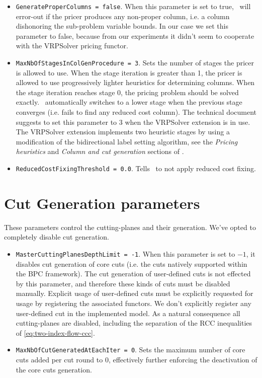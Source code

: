 \begin{itemize}
	\item \texttt{GenerateProperColumns = false}.
	      When this parameter is set to true, \bapcod\ will error-out if the pricer produces any non-proper column,
	      i.e. a column dishonoring the sub-problem variable bounds.
	      In our case we set this parameter to false,
	      because from our experiments it didn't seem to cooperate with the VRPSolver pricing functor.
	\item \texttt{MaxNbOfStagesInColGenProcedure = 3}.
	      Sets the number of stages the pricer is allowed to use.
	      When the stage iteration is greater than 1, the pricer is allowed to use
	      progressively lighter heuristics for determining columns.
	      When the stage iteration reaches stage 0, the pricing problem should be solved exactly.
	      \bapcod\ automatically switches to a lower stage when the previous stage converges (i.e. fails to find any reduced cost column).
	      The technical document suggests to set this parameter to $3$ when the VRPSolver extension is in use.
	      The VRPSolver extension implements two heuristic stages by using a modification of the bidirectional label setting algorithm,
	      see the \textit{Pricing heuristics} and \textit{Column and cut generation} sections of \textcite{sadykov2021bucket}.
	\item \texttt{ReducedCostFixingThreshold = 0.0}.
	      Tells \bapcod\ to not apply reduced cost fixing.
\end{itemize}

\section{Cut Generation parameters}
These parameters control the cutting-planes and their generation.
We've opted to completely disable cut generation.

\begin{itemize}
	\item \texttt{MasterCuttingPlanesDepthLimit = -1}.
	      When this parameter is set to $-1$, it disables cut generation of core cuts
	      (i.e. the cuts natively supported within the BPC framework).
	      The cut generation of user-defined cuts
	      is not effected by this parameter, and therefore these kinds of cuts must be disabled manually.
	      Explicit usage of user-defined cuts must be explicitly requested for usage
	      by registering the associated functors.
	      We don't explicitly register any user-defined cut in the implemented model.
	      As a natural consequence all cutting-planes are disabled, including the separation of the RCC inequalities of \cref{eq:two-index-flow-ccc}.
	\item \texttt{MaxNbOfCutGeneratedAtEachIter = 0}.
	      Sets the maximum number of core cuts added per cut round to $0$,
	      effectively further enforcing the deactivation of the core cuts generation.
\end{itemize}

